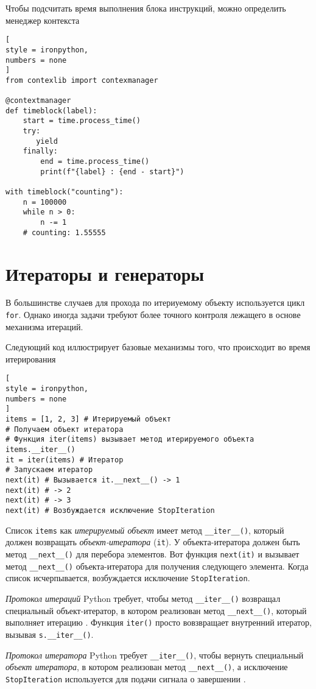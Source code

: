 \documentclass[%
	11pt,
	a4paper,
	utf8,
		]{article}
\begin{document}
Чтобы подсчитать время выполнения блока инструкций, можно определить менеджер контекста
\begin{lstlisting}[
style = ironpython,
numbers = none
]
from contexlib import contexmanager

@contextmanager
def timeblock(label):
    start = time.process_time()
    try:
       yield
    finally:
        end = time.process_time()
        print(f"{label} : {end - start}")
        
with timeblock("counting"):
	n = 100000
	while n > 0:
	    n -= 1
	# counting: 1.55555
\end{lstlisting}

\section{Итераторы и генераторы}

В большинстве случаев для прохода по итериуемому объекту используется цикл \texttt{for}. Однако иногда задачи требуют более точного контроля лежащего в основе механизма итераций. 

Следующий код иллюстрирует базовые механизмы того, что происходит во время итерирования
\begin{lstlisting}[
style = ironpython,
numbers = none
]
items = [1, 2, 3] # Итерируемый объект
# Получаем объект итератора
# Функция iter(items) вызывает метод итерируемого объекта items.__iter__()
it = iter(items) # Итератор
# Запускаем итератор
next(it) # Вызывается it.__next__() -> 1
next(it) # -> 2
next(it) # -> 3
next(it) # Возбуждается исключение StopIteration
\end{lstlisting}

Список \texttt{items} как \emph{итерируемый объект} имеет метод \verb|__iter__()|, который должен возвращать \emph{объект-итератора} (\texttt{it}). У объекта-итератора должен быть метод \verb|__next__()| для перебора элементов. Вот функция \texttt{next(it)} и вызывает метод \verb|__next__()| объекта-итератора для получения следующего элемента. Когда список исчерпывается, возбуждается исключение \texttt{StopIteration}.

\emph{Протокол итераций} Python требует, чтобы метод \verb|__iter__()| возвращал специальный объект-итератор, в котором реализован метод \verb|__next__()|, который выполняет итерацию \cite[]{beazley:python_cookbook-2019}. Функция \texttt{iter()} просто вовзвращает внутренний итератор, вызывая \verb|s.__iter__()|.

\emph{Протокол итератора} Python требует \verb|__iter__()|, чтобы вернуть специальный \emph{объект итератора}, в котором реализован метод \verb|__next__()|, а исключение \texttt{StopIteration} используется для подачи сигнала о завершении \cite[]{beazley:python_cookbook-2019}.
\end{document}
